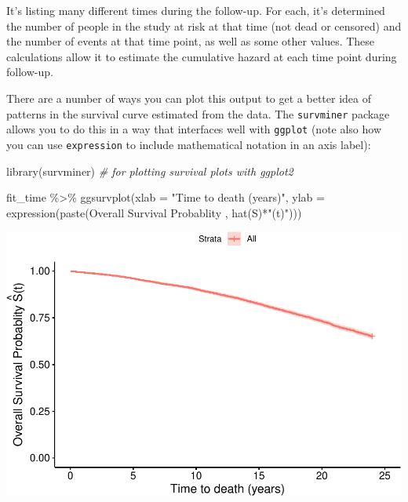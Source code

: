 \documentclass[
]{book}
\newenvironment{Shaded}{\begin{snugshade}}{\end{snugshade}}
\newcommand{\AttributeTok}[1]{\textcolor[rgb]{0.77,0.63,0.00}{#1}}
\newcommand{\CommentTok}[1]{\textcolor[rgb]{0.56,0.35,0.01}{\textit{#1}}}
\newcommand{\FunctionTok}[1]{\textcolor[rgb]{0.00,0.00,0.00}{#1}}
\newcommand{\NormalTok}[1]{#1}
\newcommand{\SpecialCharTok}[1]{\textcolor[rgb]{0.00,0.00,0.00}{#1}}
\newcommand{\StringTok}[1]{\textcolor[rgb]{0.31,0.60,0.02}{#1}}
\begin{document}
It's listing many different times during the follow-up. For each, it's determined the number of people in the study at risk at that time (not dead or censored) and the number of events at that time point, as well as some other values. These calculations allow it to estimate the cumulative hazard at each time point during follow-up.

There are a number of ways you can plot this output to get a better idea of patterns in the survival curve estimated from the data. The \texttt{survminer} package allows you to do this in a way that interfaces well with \texttt{ggplot} (note also how you can use \texttt{expression} to include mathematical notation in an axis label):

\begin{Shaded}
\begin{Highlighting}[]
\FunctionTok{library}\NormalTok{(survminer) }\CommentTok{\# for plotting survival plots with ggplot2}

\NormalTok{fit\_time }\SpecialCharTok{\%\textgreater{}\%} 
  \FunctionTok{ggsurvplot}\NormalTok{(}\AttributeTok{xlab =} \StringTok{"Time to death (years)"}\NormalTok{,}
             \AttributeTok{ylab =} \FunctionTok{expression}\NormalTok{(}\FunctionTok{paste}\NormalTok{(}\StringTok{\textquotesingle{}Overall Survival Probablity \textquotesingle{}}\NormalTok{, }
                                     \FunctionTok{hat}\NormalTok{(S)}\SpecialCharTok{*}\StringTok{"(t)"}\NormalTok{)))}
\end{Highlighting}
\end{Shaded}

\includegraphics{adv_epi_analysis_files/figure-latex/unnamed-chunk-201-1.pdf}
\end{document}
